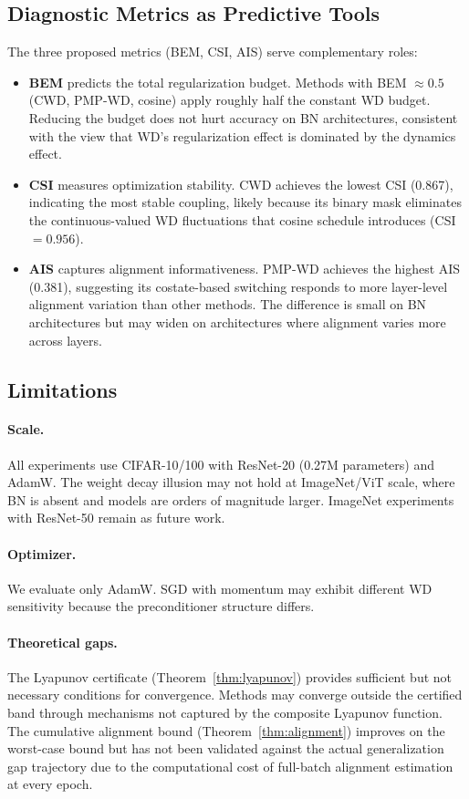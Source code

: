 \documentclass{article}
\begin{document}
\subsection{Diagnostic Metrics as Predictive Tools}

The three proposed metrics (BEM, CSI, AIS) serve complementary roles:

\begin{itemize}
\item \textbf{BEM} predicts the total regularization budget. Methods with BEM $\approx 0.5$ (CWD, PMP-WD, cosine) apply roughly half the constant WD budget. Reducing the budget does not hurt accuracy on BN architectures, consistent with the view that WD's regularization effect is dominated by the dynamics effect.
\item \textbf{CSI} measures optimization stability. CWD achieves the lowest CSI (0.867), indicating the most stable coupling, likely because its binary mask eliminates the continuous-valued WD fluctuations that cosine schedule introduces (CSI $= 0.956$).
\item \textbf{AIS} captures alignment informativeness. PMP-WD achieves the highest AIS (0.381), suggesting its costate-based switching responds to more layer-level alignment variation than other methods. The difference is small on BN architectures but may widen on architectures where alignment varies more across layers.
\end{itemize}

\subsection{Limitations}

\paragraph{Scale.} All experiments use CIFAR-10/100 with ResNet-20 (0.27M parameters) and AdamW. The weight decay illusion may not hold at ImageNet/ViT scale, where BN is absent and models are orders of magnitude larger. ImageNet experiments with ResNet-50 remain as future work.

\paragraph{Optimizer.} We evaluate only AdamW. SGD with momentum may exhibit different WD sensitivity because the preconditioner structure differs.

\paragraph{Theoretical gaps.} The Lyapunov certificate (Theorem~\ref{thm:lyapunov}) provides sufficient but not necessary conditions for convergence. Methods may converge outside the certified band through mechanisms not captured by the composite Lyapunov function. The cumulative alignment bound (Theorem~\ref{thm:alignment}) improves on the worst-case bound but has not been validated against the actual generalization gap trajectory due to the computational cost of full-batch alignment estimation at every epoch.
\end{document}
